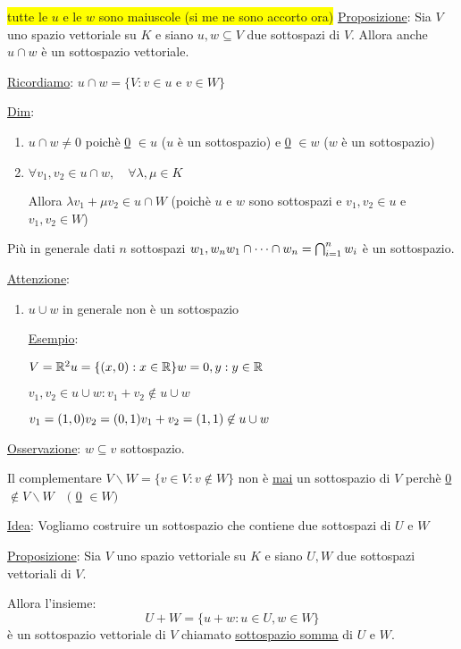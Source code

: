 \documentclass{article}
\newcommand{\hl}[1]{\colorbox{yellow}{#1}}
\newcommand{\ul}[1]{\underline{#1}}
\newcommand{\R}{\mathbb{R}}
\begin{document}
	\hl{tutte le $u$ e le $w$ sono maiuscole (si me ne sono accorto ora)}
	\ul{Proposizione}: Sia $V$ uno spazio vettoriale su $K$ e siano $u,w\subseteq V$ due sottospazi di $V$. Allora anche $u\cap w$ è un sottospazio vettoriale.

	\ul{Ricordiamo}: $u\cap w=\{V:v\in u$ e $v\in W\}$

	\ul{Dim}:
	\begin{enumerate}
		\item $u\cap w\not=0$ poichè \ul{0} $\in u$ ($u$ è un sottospazio) e \ul{0} $\in w$ ($w$ è un sottospazio)
		\item $\forall v_1,v_2\in u\cap w,\quad\forall\lambda,\mu\in K$

		      Allora $\lambda v_1+\mu v_2\in u\cap W$ (poichè $u$ e $w$ sono sottospazi e $v_1,v_2\in u$ e $v_1,v_2\in W$)
	\end{enumerate}

	Più in generale dati $n$ sottospazi $w_1,w_n\\w_1\cap\cdots\cap w_n=\bigcap^n_{i=1}w_i$ è un sottospazio.

	\ul{Attenzione}:
	\begin{enumerate}
		\item $u\cup w$ in generale non è un sottospazio

		      \ul{Esempio}:

		      $V=\R^2\\u=\{(x,0):x\in\R\}\\w={0,y}:y\in\R$

		      $v_1,v_2\in u\cup w:v_1+v_2\not\in u\cup w$

		      $v_1=(1,0)\\v_2=(0,1)\\v_1+v_2=(1,1)\not\in u\cup w$
	\end{enumerate}

	\ul{Osservazione}: $w\subseteq v$ sottospazio.

	Il complementare $V\backslash W=\{v\in V:v\not\in W\}$ non è \ul{mai} un sottospazio di $V$ perchè \ul{0} $\not\in V\backslash W\quad($ \ul{0} $\in W)$

	\ul{Idea}: Vogliamo costruire un sottospazio che contiene due sottospazi di $U$ e $W$

	\ul{Proposizione}: Sia $V$ uno spazio vettoriale su $K$ e siano $U,W$ due sottospazi vettoriali di $V$.

	Allora l'insieme:
	$$U+W=\{u+w:u\in U,w\in W\}$$
	è un sottospazio vettoriale di $V$ chiamato \ul{sottospazio somma} di $U$ e $W$.
\end{document}
